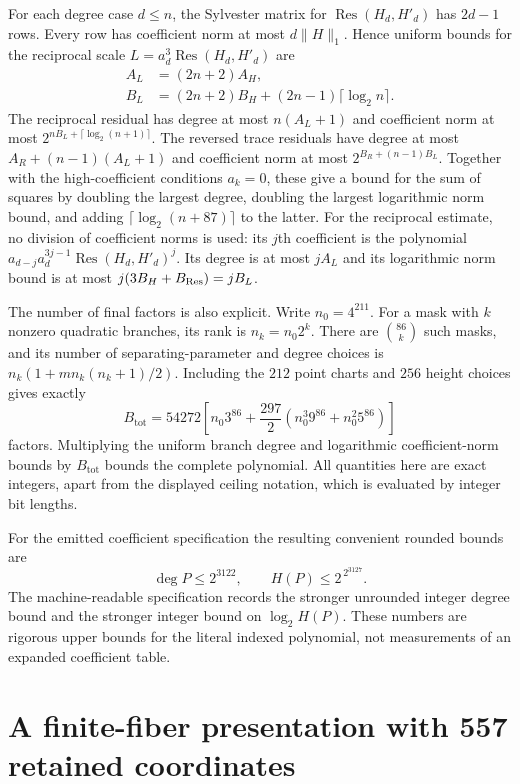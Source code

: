 \documentclass[11pt]{article}
\theoremstyle{definition}
\begin{document}
For each degree case $d\le n$, the Sylvester matrix for
$\operatorname{Res}(H_d,H'_d)$ has $2d-1$ rows. Every row has
coefficient norm at most $d\|H\|_1$. Hence uniform bounds for the
reciprocal scale $L=a_d^3\operatorname{Res}(H_d,H'_d)$ are
\begin{align*}
 A_L&=(2n+2)A_H,\\
 B_L&=(2n+2)B_H+(2n-1)\lceil\log_2 n\rceil.
\end{align*}
The reciprocal residual has degree at most $n(A_L+1)$ and coefficient
norm at most $2^{nB_L+\lceil\log_2(n+1)\rceil}$. The reversed trace
residuals have degree at most $A_R+(n-1)(A_L+1)$ and coefficient norm
at most $2^{B_R+(n-1)B_L}$. Together with the high-coefficient
conditions $a_k=0$, these give a bound for the sum of squares by
doubling the largest degree, doubling the largest logarithmic norm
bound, and adding $\lceil\log_2(n+87)\rceil$ to the latter.
For the reciprocal estimate, no division of coefficient norms is used:
its $j$th coefficient is the polynomial
$a_{d-j}a_d^{3j-1}\operatorname{Res}(H_d,H'_d)^j$.
Its degree is at most $jA_L$ and its logarithmic norm bound is at most
$j(3B_H+B_{\rm Res})=jB_L$.

The number of final factors is also explicit. Write $n_0=4^{211}$.
For a mask with $k$ nonzero quadratic branches, its rank is
$n_k=n_0 2^k$. There are $\binom{86}{k}$ such masks, and its number
of separating-parameter and degree choices is
$n_k(1+m n_k(n_k+1)/2)$. Including the $212$ point charts and $256$
height choices gives exactly
\[
 B_{\mathrm{tot}}=54272\left[
 n_0 3^{86}+
 \frac{297}{2}\left(n_0^3 9^{86}+n_0^2 5^{86}\right)\right]
\]
factors. Multiplying the uniform branch degree and logarithmic
coefficient-norm bounds by $B_{\mathrm{tot}}$ bounds the complete
polynomial. All quantities here are exact integers, apart from the
displayed ceiling notation, which is evaluated by integer bit lengths.

For the emitted coefficient specification the resulting convenient
rounded bounds are
\[
 \deg P\le2^{3122},\qquad H(P)\le2^{\,2^{3127}}.
\]
The machine-readable specification records the stronger unrounded
integer degree bound and the stronger integer bound on $\log_2 H(P)$.
These numbers are rigorous upper bounds for the literal indexed
polynomial, not measurements of an expanded coefficient table.


\section{A finite-fiber presentation with 557 retained coordinates}
\label{sec:finite-fibre-application}
\end{document}
